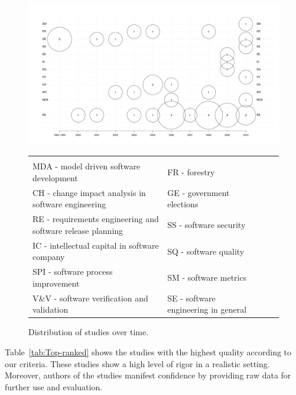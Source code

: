 \begin{figure}
\center
\includegraphics[bb=70bp 40bp 1180bp 670bp,clip,scale=0.28]{fig/bubble}

\begin{tabular}
{l>{\raggedright}b{}l>{\raggedright}b{}l} 
&\tabularnewline
\tiny
MDA - model driven software development  					& \tiny FR - forestry  \tabularnewline
\tiny CH - change impact analysis in software engineering 			& \tiny GE - government elections \tabularnewline
\tiny RE - requirements engineering and software release planning 	& \tiny SS - software security \tabularnewline
\tiny IC - intellectual capital in software company 				& \tiny SQ - software quality \tabularnewline
\tiny SPI - software process improvement 						& \tiny SM - software metrics \tabularnewline
\tiny V\&V - software verification and validation & \tiny SE - software engineering in general\tabularnewline
\end{tabular}
\caption{\label{fig:bubble}Distribution of studies over time.}

\end{figure}

Table~\ref{tab:Top-ranked} shows the studies with the highest quality according to our criteria.
These studies show a high level of rigor in a realistic setting. Moreover, authors of the studies manifest confidence by providing raw data for further use and evaluation.

